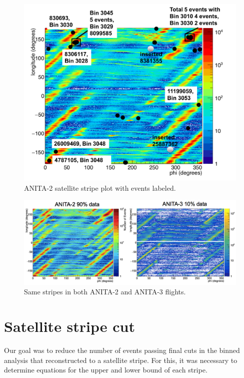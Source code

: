 \begin{figure}
\centering
\includegraphics[width=1.0\textwidth]{figures/A2StripesSatInserted.png}
\caption{ANITA-2 satellite stripe plot with events labeled.}
\label{satstripesa2}
\end{figure}

\begin{figure}
\centering
\includegraphics[width=1.0\textwidth]{figures/same_stripes.png}
\caption{Same stripes in both ANITA-2 and ANITA-3 flights.}
\label{stripes}
\end{figure}


\section{Satellite stripe cut}
\label{removing_sat}

Our goal was to reduce the number of events passing final cuts in the binned analysis that reconstructed to a satellite stripe. For this, it was necessary to determine equations for the upper and lower bound of each stripe. 

